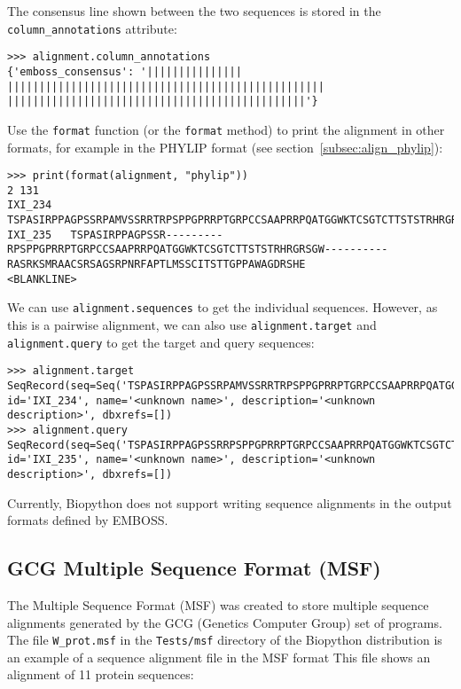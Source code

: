 The consensus line shown between the two sequences is stored in the \verb|column_annotations| attribute:
\begin{verbatim}
>>> alignment.column_annotations
{'emboss_consensus': '|||||||||||||||         ||||||||||||||||||||||||||||||||||||||||||||||||||          |||||||||||||||||||||||||||||||||||||||||||||||'}
\end{verbatim}
Use the \verb|format| function (or the \verb|format| method) to print the alignment in other formats, for example in the PHYLIP format (see section~\ref{subsec:align_phylip}):
\begin{verbatim}
>>> print(format(alignment, "phylip"))
2 131
IXI_234   TSPASIRPPAGPSSRPAMVSSRRTRPSPPGPRRPTGRPCCSAAPRRPQATGGWKTCSGTCTTSTSTRHRGRSGWSARTTTAACLRASRKSMRAACSRSAGSRPNRFAPTLMSSCITSTTGPPAWAGDRSHE
IXI_235   TSPASIRPPAGPSSR---------RPSPPGPRRPTGRPCCSAAPRRPQATGGWKTCSGTCTTSTSTRHRGRSGW----------RASRKSMRAACSRSAGSRPNRFAPTLMSSCITSTTGPPAWAGDRSHE
<BLANKLINE>
\end{verbatim}
We can use \verb|alignment.sequences| to get the individual sequences. However, as this is a pairwise alignment, we can also use \verb|alignment.target| and \verb|alignment.query| to get the target and query sequences:
\begin{verbatim}
>>> alignment.target
SeqRecord(seq=Seq('TSPASIRPPAGPSSRPAMVSSRRTRPSPPGPRRPTGRPCCSAAPRRPQATGGWK...SHE'), id='IXI_234', name='<unknown name>', description='<unknown description>', dbxrefs=[])
>>> alignment.query
SeqRecord(seq=Seq('TSPASIRPPAGPSSRRPSPPGPRRPTGRPCCSAAPRRPQATGGWKTCSGTCTTS...SHE'), id='IXI_235', name='<unknown name>', description='<unknown description>', dbxrefs=[])
\end{verbatim}
Currently, Biopython does not support writing sequence alignments in the output formats defined by EMBOSS.

\subsection{GCG Multiple Sequence Format (MSF)}
\label{subsec:align_msf}

The Multiple Sequence Format (MSF) was created to store multiple sequence alignments generated by the GCG (Genetics Computer Group) set of programs. The file \verb|W_prot.msf| in the \verb|Tests/msf| directory of the Biopython distribution is an example of a sequence alignment file in the MSF format This file shows an alignment of 11 protein sequences:

